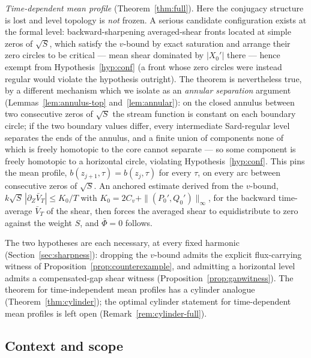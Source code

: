 \documentclass[11pt]{amsart}
\theoremstyle{definition}
\theoremstyle{remark}
\newcommand{\Fbar}{\bar\Phi}
\begin{document}
\emph{Time-dependent mean profile} (Theorem~\ref{thm:full}). Here the
conjugacy structure is lost and level topology is \emph{not} frozen. A
serious candidate configuration exists at the formal level:
backward-sharpening averaged-shear fronts located at simple zeros of
$\sqrt S$, which satisfy the $v$-bound by exact saturation and arrange
their zero circles to be critical --- mean shear dominated by $|X_0'|$
there --- hence exempt from Hypothesis~\ref{hyp:conf} (a front whose
zero circles were instead regular would violate the hypothesis
outright). The theorem is nevertheless true, by a different mechanism
which we isolate as an \emph{annular separation} argument
(Lemmas~\ref{lem:annulus-top} and~\ref{lem:annular}): on the closed
annulus between two consecutive zeros of $\sqrt S$ the stream function
is constant on each boundary circle; if the two boundary values differ,
every intermediate Sard-regular level separates the ends of the annulus,
and a finite union of components none of which is freely homotopic to the
core cannot separate --- so some component is freely homotopic to a
horizontal circle, violating Hypothesis~\ref{hyp:conf}. This pins the mean profile,
$b(z_{j+1},\tau)=b(z_j,\tau)$ for every $\tau$, on every arc between
consecutive zeros of $\sqrt S$. An anchored estimate derived from the
$v$-bound, $k\sqrt S\,|\partial_Z\bar V_T|\le K_0/T$ with
$K_0=2C_v+\|(P_0',Q_0')\|_\infty$, for the backward time-average
$\bar V_T$ of the shear, then forces the averaged shear to
equidistribute to zero against the weight $S$, and $\Fbar=0$ follows.

The two hypotheses are each necessary, at every fixed harmonic
(Section~\ref{sec:sharpness}):
dropping the $v$-bound admits the explicit flux-carrying witness of
Proposition~\ref{prop:counterexample}, and admitting a horizontal level
admits a compensated-gap shear witness
(Proposition~\ref{prop:gapwitness}). The theorem for time-independent
mean profiles has a cylinder analogue (Theorem~\ref{thm:cylinder}); the
optimal cylinder statement for time-dependent mean profiles is left open
(Remark~\ref{rem:cylinder-full}).

\subsection*{Context and scope}
\end{document}
